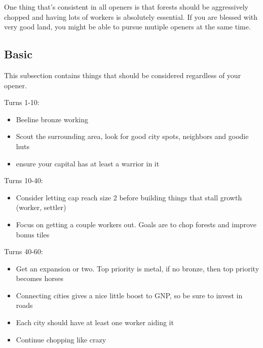 \documentclass[10pt]{article}
\begin{document}
One thing that's consistent in all openers is that forests should be aggressively chopped and
having lots of workers is absolutely essential. If you are blessed with very good land, you
might be able to pursue mutiple openers at the same time.

\subsection*{Basic}

This subsection contains things that should be considered regardless of your opener.

Turns 1-10:
\begin{itemize}
\item Beeline bronze working
\item Scout the surrounding area, look for good city spots, neighbors and goodie huts
\item ensure your capital has at least a warrior in it
\end{itemize}

Turns 10-40:
\begin{itemize}
\item Consider letting cap reach size 2 before building things that stall growth (worker, settler)
\item Focus on getting a couple workers out. Goals are to chop forests and improve bonus tiles
\end{itemize}

Turns 40-60:
\begin{itemize}
\item Get an expansion or two. Top priority is metal, if no bronze, then top priority becomes horses
\item Connecting cities gives a nice little boost to GNP, so be sure to invest in roads
\item Each city should have at least one worker aiding it
\item Continue chopping like crazy
\end{itemize}
\end{document}
